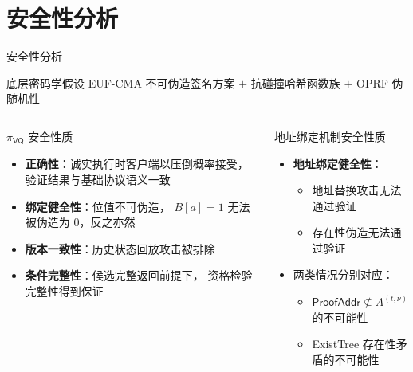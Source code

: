 \section{安全性分析}

\begin{frame}{安全性分析}

  \begin{block}{底层密码学假设}
    EUF-CMA 不可伪造签名方案
    $+$ 抗碰撞哈希函数族
    $+$ OPRF 伪随机性
  \end{block}

  \vspace{0.4em}

  \begin{columns}[T]
      \begin{exampleblock}{$\pi_\mathsf{VQ}$ 安全性质}
        \begin{itemize}
          \item \textbf{正确性}：诚实执行时客户端以压倒概率接受，
                验证结果与基础协议语义一致
          \item \textbf{绑定健全性}：位值不可伪造，
                $B[a]=1$ 无法被伪造为 $0$，反之亦然
          \item \textbf{版本一致性}：历史状态回放攻击被排除
          \item \textbf{条件完整性}：候选完整返回前提下，
                资格检验完整性得到保证
        \end{itemize}
      \end{exampleblock}

      \begin{exampleblock}{地址绑定机制安全性质}
        \begin{itemize}
          \item \textbf{地址绑定健全性}：
            \begin{itemize}
              \item 地址替换攻击无法通过验证
              \item 存在性伪造无法通过验证
            \end{itemize}
          \item 两类情况分别对应：
            \begin{itemize}
              \item $\mathsf{ProofAddr} \not\subseteq A^{(t,\nu)}$ 的不可能性
              \item ExistTree 存在性矛盾的不可能性
            \end{itemize}
        \end{itemize}
      \end{exampleblock}
  \end{columns}

\end{frame}
